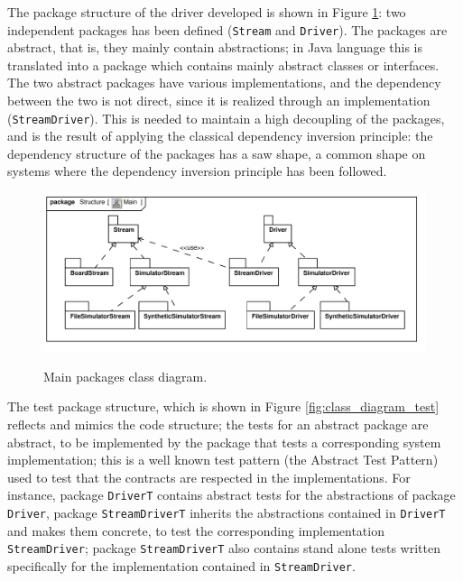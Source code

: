 \documentclass{article} \usepackage{times}
\newcommand{\lil}[1]{\texttt{\lstinline|#1|}}
\begin{document}
The package structure of the driver developed is shown in Figure
\ref{fig:class_diagram_main}: two independent packages has been
defined (\lil{Stream} and \lil{Driver}).  The packages are abstract,
that is, they mainly contain abstractions; in Java language this is
translated into a package which contains mainly abstract classes or
interfaces.  The two abstract packages have various implementations,
and the dependency between the two is not direct, since it is realized
through an implementation (\lil{StreamDriver}).  This is needed to
maintain a high decoupling of the packages, and is the result of
applying the classical dependency inversion
principle\cite{martin1996dependency}: the dependency structure of the
packages has a saw shape, a common shape on systems where the
dependency inversion principle has been followed.

\begin{figure}[htb!]
  \centering
  \includegraphics[scale=0.7]{UML_model/Class_Diagram__Structure__Main}
  \label{fig:class_diagram_main}
  \caption{Main packages class diagram.}
\end{figure}

The test package structure, which is shown in Figure
\ref{fig:class_diagram_test} reflects and mimics the code structure;
the tests for an abstract package are abstract, to be implemented by
the package that tests a corresponding system implementation; this is
a well known test pattern (the Abstract Test
Pattern\cite{thomas2004java}) used to test that the contracts are
respected in the implementations.  For instance, package \lil{DriverT}
contains abstract tests for the abstractions of package \lil{Driver},
package \lil{StreamDriverT} inherits the abstractions contained in
\lil{DriverT} and makes them concrete, to test the corresponding
implementation \lil{StreamDriver}; package \lil{StreamDriverT} also
contains stand alone tests written specifically for the implementation
contained in \lil{StreamDriver}.
\end{document}
